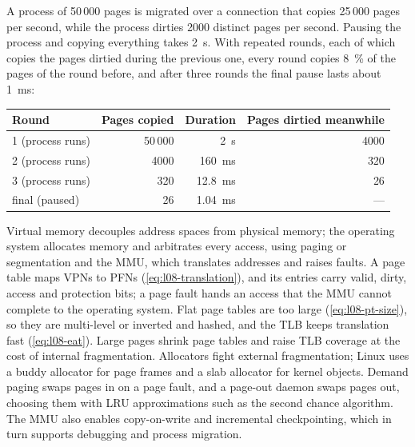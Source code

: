 \documentclass[../main.tex]{subfiles}
\begin{document}
\begin{example}
  A process of 50\,000 pages is migrated over a connection that copies
  25\,000 pages per second, while the process dirties 2000 distinct pages
  per second.  Pausing the process and copying everything takes
  \SI{2}{\second}.  With repeated rounds, each of which copies the pages
  dirtied during the previous one, every round copies \SI{8}{\percent} of
  the pages of the round before, and after three rounds the final pause
  lasts about \SI{1}{\milli\second}:
  \begin{center}
    \small
    \begin{tabular}{@{}lrrr@{}}
      \toprule
      Round & Pages copied & Duration & Pages dirtied meanwhile \\
      \midrule
      1 (process runs)   & 50\,000 & \SI{2}{\second}             & 4000 \\
      2 (process runs)   & 4000    & \SI{160}{\milli\second}     & 320 \\
      3 (process runs)   & 320     & \SI{12.8}{\milli\second}    & 26 \\
      final (paused)     & 26      & \SI{1.04}{\milli\second}    & --- \\
      \bottomrule
    \end{tabular}
  \end{center}
\end{example}


\begin{keypoint}
  Virtual memory decouples address spaces from physical memory; the
  operating system allocates memory and arbitrates every access, using
  paging or segmentation and the MMU, which translates addresses and raises
  faults.  A page table maps VPNs to PFNs (\cref{eq:l08-translation}), and
  its entries carry valid, dirty, access and protection bits; a page fault
  hands an access that the MMU cannot complete to the operating system.
  Flat page tables are too large (\cref{eq:l08-pt-size}), so they are
  multi-level or inverted and hashed, and the TLB keeps translation fast
  (\cref{eq:l08-eat}).  Large pages shrink page tables and raise TLB
  coverage at the cost of internal fragmentation.  Allocators fight external
  fragmentation; Linux uses a buddy allocator for page frames and a slab
  allocator for kernel objects.  Demand paging swaps pages in on a page fault,
  and a page-out daemon swaps pages out, choosing them with LRU
  approximations such as the second chance algorithm.  The MMU also enables
  copy-on-write and incremental checkpointing, which in turn supports
  debugging and process migration.
\end{keypoint}
\end{document}

